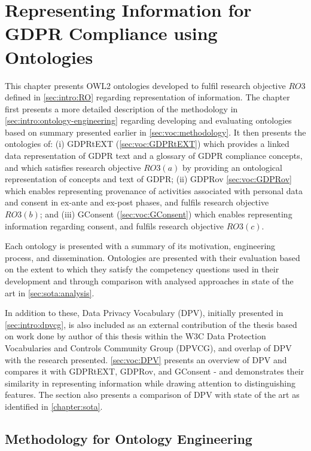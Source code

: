 \chapter{Representing Information for GDPR Compliance using Ontologies}
\label{chapter:vocabularies}

This chapter presents OWL2 ontologies developed to fulfil research objective $RO3$ defined in \autoref{sec:intro:RO} regarding representation of information.
The chapter first presents a more detailed description of the methodology in \autoref{sec:intro:ontology-engineering} regarding developing and evaluating ontologies based on summary presented earlier in \autoref{sec:voc:methodology}.
It then presents the ontologies of: (i) GDPRtEXT (\autoref{sec:voc:GDPRtEXT}) which provides a linked data representation of GDPR text and a glossary of GDPR compliance concepts, and which satisfies research objective $RO3(a)$ by providing an ontological representation of concepts and text of GDPR; (ii) GDPRov \autoref{sec:voc:GDPRov} which enables representing provenance of activities associated with personal data and consent in ex-ante and ex-post phases, and fulfils research objective $RO3(b)$; and (iii) GConsent (\autoref{sec:voc:GConsent}) which enables representing information regarding consent, and fulfils research objective $RO3(c)$.

Each ontology is presented with a summary of its motivation, engineering process, and dissemination. Ontologies are presented with their evaluation based on the extent to which they satisfy the competency questions used in their development and through comparison with analysed approaches in state of the art in \autoref{sec:sota:analysis}.

In addition to these, Data Privacy Vocabulary (DPV), initially presented in \autoref{sec:intro:dpvcg}, is also included as an external contribution of the thesis based on work done by author of this thesis within the W3C Data Protection Vocabularies and Controls Community Group (DPVCG), and overlap of DPV with the research presented. \autoref{sec:voc:DPV} presents an overview of DPV and compares it with GDPRtEXT, GDPRov, and GConsent - and demonstrates their similarity in representing information while drawing attention to distinguishing features.
The section also presents a comparison of DPV with state of the art as identified in \autoref{chapter:sota}.

\section{Methodology for Ontology Engineering}\label{sec:voc:methodology}

